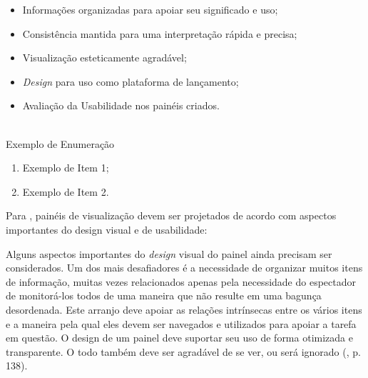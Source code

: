         \begin{itemize}
            \item Informações organizadas para apoiar seu significado e uso;
            \item Consistência mantida para uma interpretação rápida e precisa;
            \item Visualização esteticamente agradável;
            \item \textit{Design} para uso como plataforma de lançamento;
            \item Avaliação da Usabilidade nos painéis criados.
        \end{itemize}

        \textbf{ } \\
        
        Exemplo de Enumeração
        \begin{enumerate}
            \item Exemplo de Item 1;
            \item Exemplo de Item 2.
        \end{enumerate}

        \clearpage %
        
        Para , painéis de visualização devem ser projetados de acordo com aspectos importantes do design visual e de usabilidade:

        \begin{quoting}[rightmargin=0cm,leftmargin=4cm]
        \begin{singlespace}
        {\footnotesize    
            Alguns aspectos importantes do \textit{design} visual do painel ainda precisam ser considerados. Um dos mais desafiadores é a necessidade de organizar muitos itens de informação, muitas vezes relacionados apenas pela necessidade do espectador de monitorá-los todos de uma maneira que não resulte em uma bagunça desordenada. Este arranjo deve apoiar as relações intrínsecas entre os vários itens e a maneira pela qual eles devem ser navegados e utilizados para apoiar a tarefa em questão. O design de um painel deve suportar seu uso de forma otimizada e transparente. O todo também deve ser agradável de se ver, ou será ignorado 
            (, p. 138).
        }
        \end{singlespace}
        \end{quoting}
        
